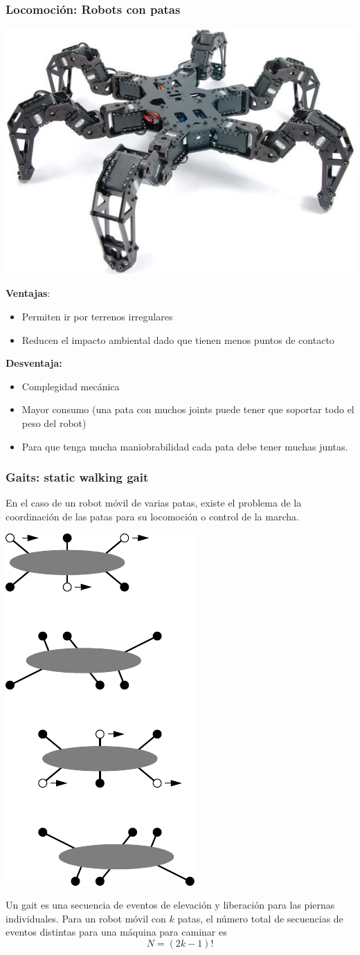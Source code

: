 \begin{frame}
    \frametitle{Locomoción: Robots con patas}

    \begin{center}
        \includegraphics[width=0.4\columnwidth]{images/hexapod_phantomX_mark_II.jpg}
    \end{center}
    \footnotesize
    {\bf Ventajas}:
    \begin{itemize}
        \item Permiten ir por terrenos irregulares
        \item Reducen el impacto ambiental dado que tienen menos puntos de contacto
    \end{itemize}
    {\bf Desventaja: }
    \begin{itemize}
        \item Complegidad mecánica
        \item Mayor consumo (una pata con muchos joints puede tener que soportar todo el peso del robot)
        \item Para que tenga mucha maniobrabilidad cada pata debe tener muchas juntas.
\end{itemize}

\end{frame}


\begin{frame}
    \frametitle{Gaits: static walking gait}
	\small
    En el caso de un robot móvil de varias patas, existe el problema de la coordinación de las patas para su locomoción o control de la marcha.

    \begin{center}
        \includegraphics[width=0.15\columnwidth]{images/hexapod_static_walking_gait.pdf}
    \end{center}

    Un gait es una secuencia de eventos de elevación y liberación para las piernas individuales. Para un robot móvil con $k$ patas, el número total de secuencias de eventos distintas para una máquina para caminar es
    \begin{equation*}
        N = \left( 2k - 1\right)!
    \end{equation*}

\end{frame}

